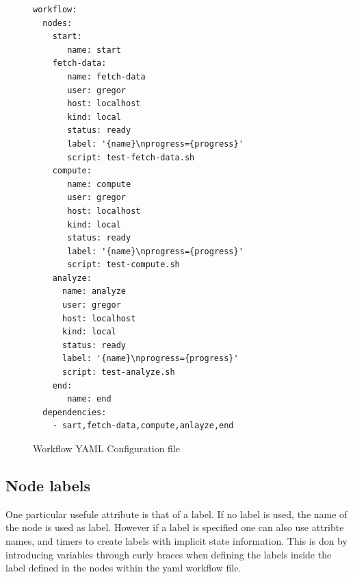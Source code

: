 \begin{figure}
\begin{verbatim}
workflow:
  nodes:
    start:
       name: start
    fetch-data:
       name: fetch-data
       user: gregor
       host: localhost
       kind: local
       status: ready
       label: '{name}\nprogress={progress}'
       script: test-fetch-data.sh
    compute:
       name: compute
       user: gregor
       host: localhost
       kind: local
       status: ready
       label: '{name}\nprogress={progress}'
       script: test-compute.sh
    analyze:
      name: analyze
      user: gregor
      host: localhost
      kind: local
      status: ready
      label: '{name}\nprogress={progress}'
      script: test-analyze.sh
    end:
       name: end
  dependencies:
    - sart,fetch-data,compute,anlayze,end
\end{verbatim}
\caption{Workflow YAML Configuration file}\label{fig:workflow-example}
\label{fig:yaml-file}
\end{figure}

\begin{table}[htb]
\caption{Node attributes}\label{tab:node-attributes}
\end{table}

\subsection{Node labels}

One particular usefule attribute is that of a label. If no label is
used, the name of the node is used as label. However if a label is
specified one can also use attribte names, and timers to create labels
with implicit state information. This is don by introducing variables
through curly braces when defining the labels inside the label defined
in the nodes within the yaml workflow file.

